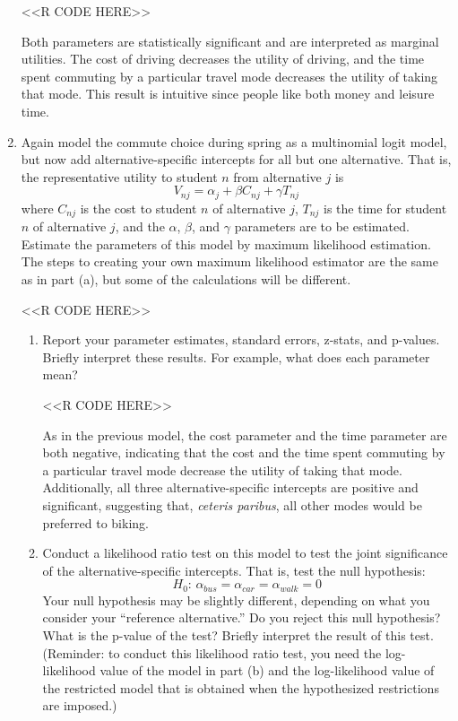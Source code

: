 \documentclass[11pt,letterpaper]{article}
\begin{document}
\begin{enumerate}[label=\alph*., leftmargin=*]
	<<R CODE HERE>>

	Both parameters are statistically significant and are interpreted as marginal utilities. The cost of driving decreases the utility of driving, and the time spent commuting by a particular travel mode decreases the utility of taking that mode. This result is intuitive since people like both money and leisure time.

	\item Again model the commute choice during spring as a multinomial logit model, but now add alternative-specific intercepts for all but one alternative. That is, the representative utility to student $n$ from alternative $j$ is
	$$V_{nj} = \alpha_j + \beta C_{nj} + \gamma T_{nj}$$
	where $C_{nj}$ is the cost to student $n$ of alternative $j$, $T_{nj}$ is the time for student $n$ of alternative $j$, and the $\alpha$, $\beta$, and $\gamma$ parameters are to be estimated. Estimate the parameters of this model by maximum likelihood estimation. The steps to creating your own maximum likelihood estimator are the same as in part (a), but some of the calculations will be different. 

	<<R CODE HERE>>

	\begin{enumerate}[label=\roman*.]
		\item Report your parameter estimates, standard errors, z-stats, and p-values. Briefly interpret these results. For example, what does each parameter mean?

		<<R CODE HERE>>

		As in the previous model, the cost parameter and the time parameter are both negative, indicating that the cost and the time spent commuting by a particular travel mode decrease the utility of taking that mode. Additionally, all three alternative-specific intercepts are positive and significant, suggesting that, \emph{ceteris paribus}, all other modes would be preferred to biking.

		\item Conduct a likelihood ratio test on this model to test the joint significance of the alternative-specific intercepts. That is, test the null hypothesis:
		$$H_0 \text{: } \alpha_{bus} = \alpha_{car} = \alpha_{walk} = 0$$
		Your null hypothesis may be slightly different, depending on what you consider your ``reference alternative.'' Do you reject this null hypothesis? What is the p-value of the test? Briefly interpret the result of this test. (Reminder: to conduct this likelihood ratio test, you need the log-likelihood value of the model in part (b) and the log-likelihood value of the restricted model that is obtained when the hypothesized restrictions are imposed.)


\end{enumerate}
\end{enumerate}
\end{document}
